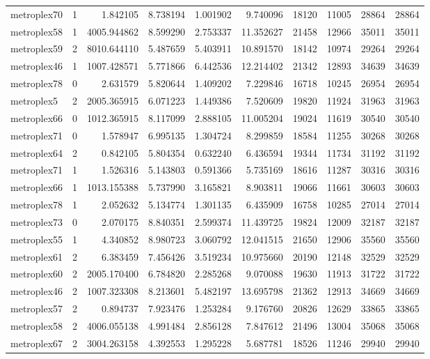 \begin{longtable}{|l|r|r|r|r|r|r|r|r|r|}
metroplex70 & 1 & 1.842105 & 8.738194 & 1.001902 & 9.740096 & 18120 & 11005 & 28864 & 28864 \\
metroplex58 & 1 & 4005.944862 & 8.599290 & 2.753337 & 11.352627 & 21458 & 12966 & 35011 & 35011 \\
metroplex59 & 2 & 8010.644110 & 5.487659 & 5.403911 & 10.891570 & 18142 & 10974 & 29264 & 29264 \\
metroplex46 & 1 & 1007.428571 & 5.771866 & 6.442536 & 12.214402 & 21342 & 12893 & 34639 & 34639 \\
metroplex78 & 0 & 2.631579 & 5.820644 & 1.409202 & 7.229846 & 16718 & 10245 & 26954 & 26954 \\
metroplex5 & 2 & 2005.365915 & 6.071223 & 1.449386 & 7.520609 & 19820 & 11924 & 31963 & 31963 \\
metroplex66 & 0 & 1012.365915 & 8.117099 & 2.888105 & 11.005204 & 19024 & 11619 & 30540 & 30540 \\
metroplex71 & 0 & 1.578947 & 6.995135 & 1.304724 & 8.299859 & 18584 & 11255 & 30268 & 30268 \\
metroplex64 & 2 & 0.842105 & 5.804354 & 0.632240 & 6.436594 & 19344 & 11734 & 31192 & 31192 \\
metroplex71 & 1 & 1.526316 & 5.143803 & 0.591366 & 5.735169 & 18616 & 11287 & 30316 & 30316 \\
metroplex66 & 1 & 1013.155388 & 5.737990 & 3.165821 & 8.903811 & 19066 & 11661 & 30603 & 30603 \\
metroplex78 & 1 & 2.052632 & 5.134774 & 1.301135 & 6.435909 & 16758 & 10285 & 27014 & 27014 \\
metroplex73 & 0 & 2.070175 & 8.840351 & 2.599374 & 11.439725 & 19824 & 12009 & 32187 & 32187 \\
metroplex55 & 1 & 4.340852 & 8.980723 & 3.060792 & 12.041515 & 21650 & 12906 & 35560 & 35560 \\
metroplex61 & 2 & 6.383459 & 7.456426 & 3.519234 & 10.975660 & 20190 & 12148 & 32529 & 32529 \\
metroplex60 & 2 & 2005.170400 & 6.784820 & 2.285268 & 9.070088 & 19630 & 11913 & 31722 & 31722 \\
metroplex46 & 2 & 1007.323308 & 8.213601 & 5.482197 & 13.695798 & 21362 & 12913 & 34669 & 34669 \\
metroplex57 & 2 & 0.894737 & 7.923476 & 1.253284 & 9.176760 & 20826 & 12629 & 33865 & 33865 \\
metroplex58 & 2 & 4006.055138 & 4.991484 & 2.856128 & 7.847612 & 21496 & 13004 & 35068 & 35068 \\
metroplex67 & 2 & 3004.263158 & 4.392553 & 1.295228 & 5.687781 & 18526 & 11246 & 29940 & 29940 \\

\end{longtable}

